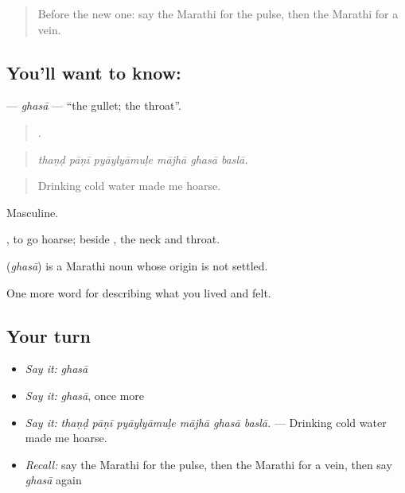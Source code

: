 \label{lesson:MR-C479-ghasa}



\begin{quote}
Before the new one: say the Marathi for the pulse, then the Marathi for a vein.
\end{quote}

\subsection*{You'll want to know: }
\textbf{} — \emph{ghasā} — \textquotedblleft{}the gullet; the throat\textquotedblright{}.

\begin{quote}
     .
\end{quote}

\begin{quote}
\emph{thaṇḍ pāṇī pyāylyāmuḷe mājhā ghasā baslā.}
\end{quote}

\begin{quote}
Drinking cold water made me hoarse.
\end{quote}

Masculine.

 , to go hoarse; beside , the neck and throat.

\begin{cousinweb}
\textbf{} (\emph{ghasā}) is a Marathi noun whose origin is not settled.
\end{cousinweb}

\begin{grammarlens}[title={What you've built}]
One more word for describing what you lived and felt.
\end{grammarlens}

\subsection*{Your turn}
\begin{itemize}
\raggedright
  \item \emph{Say it:} \emph{ghasā}
  \item \emph{Say it:} \emph{ghasā}, once more
  \item \emph{Say it:} \emph{thaṇḍ pāṇī pyāylyāmuḷe mājhā ghasā baslā.} — Drinking cold water made me hoarse.
  \item \emph{Recall:} say the Marathi for the pulse, then the Marathi for a vein, then say \emph{ghasā} again
\end{itemize}

